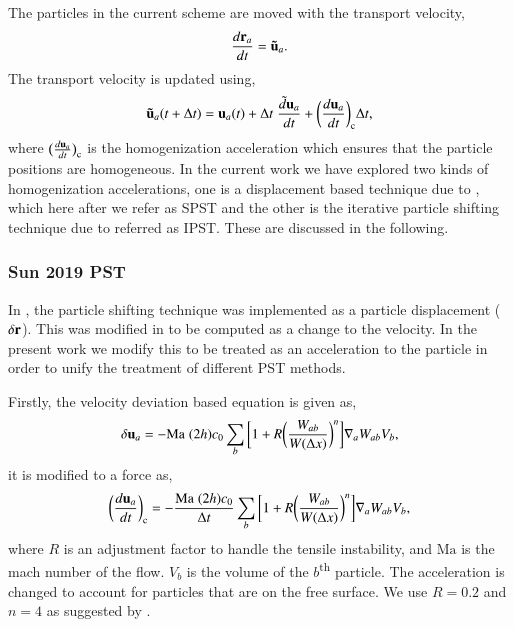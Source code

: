 The particles in the current scheme are moved with the transport velocity,
\begin{equation}
  \label{eq:transport_velocity_position_derivative}
  \frac{d\mathbf{r}_a}{dt} = \mathbf{\tilde{u}}_a.
\end{equation}
%
The transport velocity is updated using,
\begin{equation}
  \label{eq:transport_velocity}
  \mathbf{\tilde{u}}_a(t + \Delta t) =\mathbf{u}_a(t) + \Delta t \; \frac{\tilde{d} \mathbf{u}_a}{dt} +
  \bigg(\frac{d \mathbf{u}_{a}}{dt}\bigg)_{\text{c}} \Delta t,
\end{equation}
%
where $\big(\frac{d \mathbf{u}_a}{dt}\big)_{\text{c}}$ is the homogenization
acceleration which ensures that the particle positions are homogeneous. In the
current work we have explored two kinds of homogenization accelerations, one
is a displacement based technique due to \cite{sun2017deltaplus}, which here
after we refer as SPST and the other is the iterative particle shifting
technique due to \cite{huang_kernel_2019} referred as IPST. These are
discussed in the following.


\subsubsection{Sun 2019 PST}
\label{sec:sunpst}

In \cite{sun2017deltaplus}, the particle shifting technique was implemented as
a particle displacement ($\delta \mathbf{r}$). This was modified in
\cite{sun_consistent_2019} to be computed as a change to the velocity. In the
present work we modify this to be treated as an acceleration to the particle
in order to unify the treatment of different PST methods.

Firstly, the velocity deviation based equation is given as,
\begin{equation}
  \label{eq:sun2019_pst}
  \delta \mathbf{u}_a = - \text{Ma} \; (2h) c_0 \sum_b \bigg[
  1 + R \bigg( \frac{W_{ab}}{W(\Delta x)} \bigg)^n  \bigg] \nabla_a W_{ab} V_b,
\end{equation}
%
it is modified to a force as,
\begin{equation}
  \label{eq:sun2019_pst}
  \bigg(\frac{d \mathbf{u}_a}{dt}\bigg)_{\text{c}} = - \frac{\text{Ma} \;
    (2h) c_0}{\Delta t} \sum_b \bigg[1 + R \bigg( \frac{W_{ab}}{W(\Delta x)} \bigg)^n
  \bigg] \nabla_a W_{ab} V_b,
\end{equation}
where $R$ is an adjustment factor to handle the tensile instability, and
$\text{Ma}$ is the mach number of the flow. $V_b$ is the volume of the
$b$\textsuperscript{th} particle. The acceleration is changed to account for
particles that are on the free surface. We use $R = 0.2$ and $n = 4$ as
suggested by \cite{sun_consistent_2019}.

